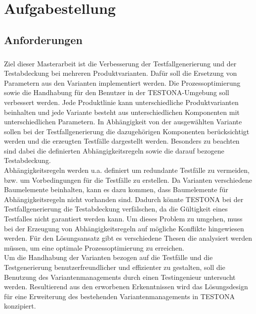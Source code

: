
\chapter{Aufgabestellung}\label{chp:aufgabenstellung}

\section{Anforderungen}
\paragraph{}
Ziel dieser Masterarbeit ist die Verbesserung der Testfallgenerierung und der Testabdeckung bei mehreren Produktvarianten. Dafür soll die Ersetzung von Parametern aus den Varianten implementiert werden. Die Prozessoptimierung sowie die Handhabung für den Benutzer in der TESTONA-Umgebung soll verbessert werden. Jede Produktlinie kann unterschiedliche Produktvarianten beinhalten und jede Variante besteht aus unterschiedlichen Komponenten mit unterschiedlichen Parametern. In Abhängigkeit von der ausgewählten Variante sollen bei der Testfallgenerierung die dazugehörigen Komponenten berücksichtigt werden und die erzeugten Testfälle dargestellt werden. Besonders zu beachten sind dabei die definierten Abhängigkeitsregeln sowie die darauf bezogene Testabdeckung.\\

Abhängigkeitsregeln werden u.a. definiert um redundante Testfälle zu vermeiden, bzw. um Vorbedingungen für die Testfälle zu erstellen. Da Varianten verschiedene Baumelemente beinhalten, kann es dazu kommen, dass Baumelemente für Abhängigkeitsregeln nicht vorhanden sind. Dadurch könnte TESTONA bei der Testfallgenerierung die Testabdeckung verfälschen, da die Gültigkeit eines Testfalles nicht garantiert werden kann. Um dieses Problem zu umgehen, muss bei der Erzeugung von Abhängigkeitsregeln auf mögliche Konflikte hingewiesen werden. Für den Lösungsansatz gibt es verschiedene Thesen die analysiert werden müssen, um eine optimale Prozessoptimierung zu erreichen.\\

Um die Handhabung der Varianten bezogen auf die Testfälle und die Testgenerierung benutzerfreundlicher und effizienter zu gestalten, soll die Benutzung des Variantenmanagements durch einen Testingenieur untersucht werden. Resultierend aus den erworbenen Erkenntnissen wird das Lösungsdesign für eine Erweiterung des bestehenden Variantenmanagements in TESTONA konzipiert.\\

